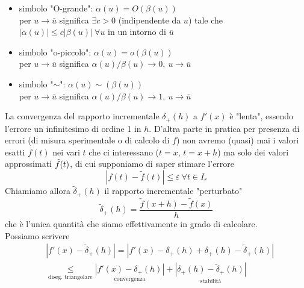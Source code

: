 \documentclass[12pt,a4paper]{article}
\begin{document}
\begin{itemize}
    \item simbolo "O-grande": $\alpha(u)=O(\beta(u))$ \\
    per $u \rightarrow \overline{u}$ significa $\exists c > 0$ (indipendente da $u$) tale che $|\alpha(u)| \leq c|\beta(u)| \ \forall u$ in un intorno di $\overline{u}$ 
    \item simbolo "o-piccolo": $\alpha(u)=o(\beta(u))$ \\
    per $u \rightarrow \overline{u}$ significa $\alpha(u) / \beta(u) \rightarrow 0, \ u \rightarrow \overline{u}$
    \item simbolo "$\sim$": $\alpha(u)\sim(\beta(u))$ \\
    per $u \rightarrow \overline{u}$ significa $\alpha(u) / \beta(u) \rightarrow 1, \ u \rightarrow \overline{u}$
\end{itemize}
La convergenza del rapporto incrementale $\delta_+(h)$ a $f'(x)$ è "lenta", essendo l'errore un infinitesimo di ordine 1 in $h$.
\newline
D'altra parte in pratica per presenza di errori (di misura sperimentale o di calcolo di $f$) non avremo (quasi) mai i valori esatti $f(t)$ nei vari $t$ che ci interessano ($t=x$, $t=x+h$) ma solo dei valori approssimati $\Tilde{f}(t)$, di cui supponiamo di saper stimare l'errore
\begin{equation*}
    |f(t) - \tilde{f}(t)| \leq \varepsilon \ \forall t \in I_r
\end{equation*}
Chiamiamo allora $\tilde{\delta}_+(h)$ il rapporto incrementale "perturbato"
\begin{equation*}
    \tilde{\delta}_+(h) = \frac{\tilde{f}(x+h)-\tilde{f}(x)}{h}
\end{equation*}
che è l'unica quantità che siamo effettivamente in grado di calcolare.\\
Possiamo scrivere
\begin{equation*}
    \begin{split}
        & |f'(x)-\tilde{\delta}_+(h)| = |f'(x)-\delta_+(h)+\delta_+(h)-\tilde{\delta}_+(h)| \\
        & \underset{\text{diseg. triangolare}}{\leq} \underset{\text{convergenza}}{|f'(x)-\delta_+(h)|} + \underset{\text{stabilità}}{|\delta_+(h)-\tilde{\delta}_+(h)|}
    \end{split}
\end{equation*}
\end{document}
